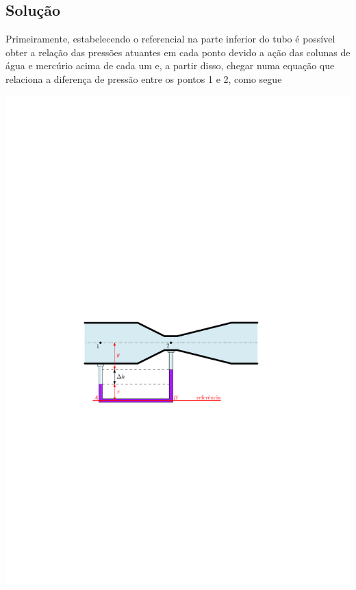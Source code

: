 \documentclass[a4paper, 12pt, brazilian]{article}
\begin{document}
	\subsection{Solução}
	Primeiramente, estabelecendo o referencial na parte inferior do tubo é possível obter a relação das pressões atuantes em cada ponto devido a ação das colunas de água e mercúrio acima de cada um e, a partir disso, chegar numa equação que relaciona a diferença de pressão entre os pontos 1 e 2, como segue
	\begin{center}
		\includegraphics[width=.9\linewidth]{assets/images/referencia_5}
	\end{center}
\end{document}
